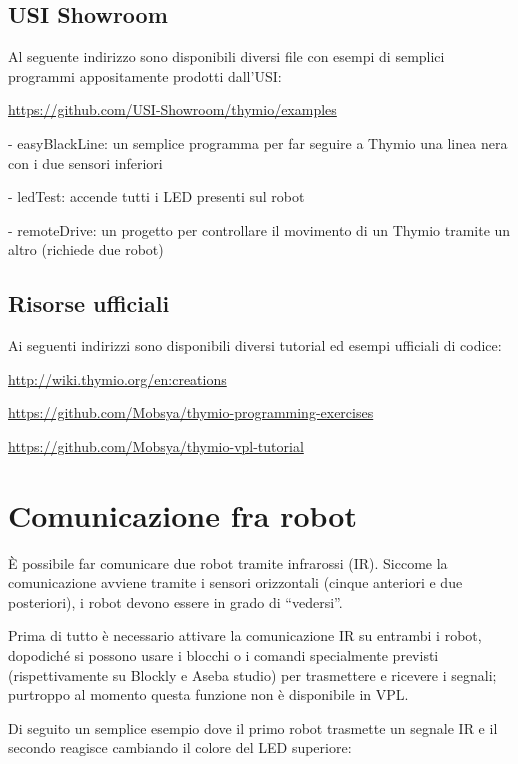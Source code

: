 \documentclass[12pt]{article}
\begin{document}
	\subsection{USI Showroom}
		
		Al seguente indirizzo sono disponibili diversi file con esempi di semplici programmi appositamente prodotti dall'USI:
		
		\url{https://github.com/USI-Showroom/thymio/examples}
		
		
		- easyBlackLine: un semplice programma per far seguire a Thymio una linea nera con i due sensori inferiori
		
		- ledTest: accende tutti i LED presenti sul robot
		
		- remoteDrive: un progetto per controllare il movimento di un Thymio tramite un altro (richiede due robot)
		
	
	\subsection{Risorse ufficiali}
	
		Ai seguenti indirizzi sono disponibili diversi tutorial ed esempi ufficiali di codice:
	
		\url{http://wiki.thymio.org/en:creations}
		
		\url{https://github.com/Mobsya/thymio-programming-exercises}
		
		\url{https://github.com/Mobsya/thymio-vpl-tutorial}
	
	
\section{Comunicazione fra robot}\label{network}

	È possibile far comunicare due robot tramite infrarossi (IR). Siccome la comunicazione avviene tramite i sensori orizzontali (cinque anteriori e due posteriori), i robot devono essere in grado di ``vedersi''.
	
	Prima di tutto è necessario attivare la comunicazione IR su entrambi i robot, dopodiché si possono usare i blocchi o i comandi specialmente previsti (rispettivamente su Blockly e Aseba studio) per trasmettere e ricevere i segnali; purtroppo al momento questa funzione non è disponibile in VPL. 
	
	Di seguito un semplice esempio dove il primo robot trasmette un segnale IR e il secondo reagisce cambiando il colore del LED superiore: 
	
\end{document}
